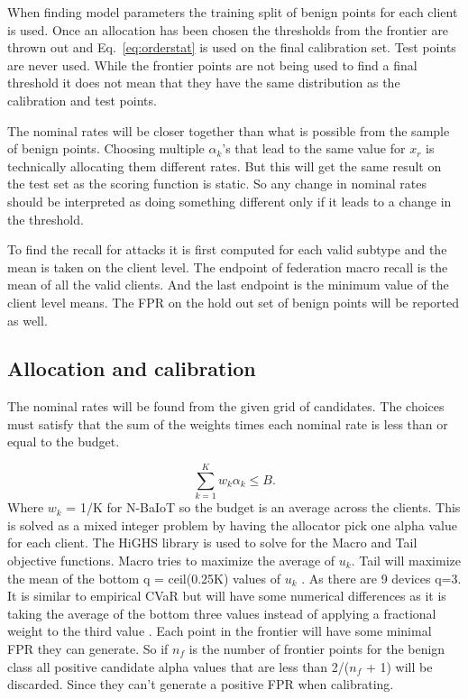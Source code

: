 \documentclass[pdflatex,sn-mathphys-num]{sn-jnl}
\begin{document}
When finding model parameters the training split of benign points for each client is used. Once an allocation has been chosen the thresholds from the frontier are thrown out and Eq.~\ref{eq:orderstat} is used on the final calibration set. Test points are never used. While the frontier points are not being used to find a final threshold it does not mean that they have the same distribution as the calibration and test points.

The nominal rates will be closer together than what is possible from the sample of benign points. Choosing multiple $\alpha_k$'s that lead to the same value for $x_r$ is technically allocating them different rates. But this will get the same result on the test set as the scoring function is static. So any change in nominal rates should be interpreted as doing something different only if it leads to a change in the threshold.

To find the recall for attacks it is first computed for each valid subtype and the mean is taken on the client level. The endpoint of federation macro recall is the mean of all the valid clients. And the last endpoint is the minimum value of the client level means. The FPR on the hold out set of benign points will be reported as well.

\subsection{Allocation and calibration}
The nominal rates will be found from the given grid of candidates. The choices must satisfy that the sum of the weights times each nominal rate is less than or equal to the budget.

\begin{equation}
 \sum_{k=1}^{K} w_k\alpha_k\leq B. \label{eq:budget}
\end{equation}
Where $w_k$ = 1/K for N-BaIoT so the budget is an average across the clients. This is solved as a mixed integer problem by having the allocator pick one alpha value for each client. The HiGHS library is used to solve for the Macro and Tail objective functions. Macro tries to maximize the average of $u_k$. Tail will maximize the mean of the bottom q = ceil(0.25K) values of $u_k$ \cite{rockafellar2000cvar}. As there are 9 devices q=3. It is similar to empirical CVaR but will have some numerical differences as it is taking the average of the bottom three values instead of applying a fractional weight to the third value \cite{rockafellar2000cvar}. Each point in the frontier will have some minimal FPR they can generate. So if $n_f$ is the number of frontier points for the benign class all positive candidate alpha values that are less than 2/($n_f$ + 1) will be discarded. Since they can't generate a positive FPR when calibrating.
\end{document}

